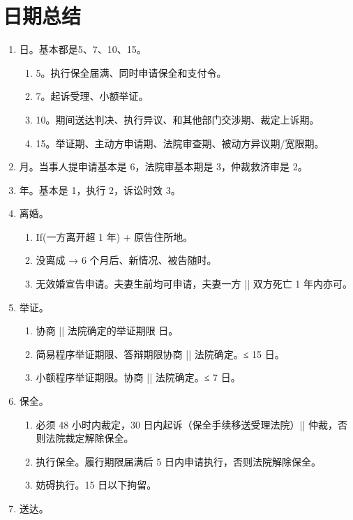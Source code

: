 \section{日期总结}
\begin{enumerate}
  \item 日。基本都是5、7、10、15。
        \begin{enumerate}
          \item 5。执行保全届满、同时申请保全和支付令。
          \item 7。起诉受理、小额举证。
          \item 10。期间送达判决、执行异议、和其他部门交涉期、裁定上诉期。
          \item 15。举证期、主动方申请期、法院审查期、被动方异议期/宽限期。
        \end{enumerate}
  \item 月。当事人提申请基本是 6，法院审基本期是 3，仲裁救济审是 2。
  \item 年。基本是 1，执行 2，诉讼时效 3。
  \item 离婚。
        \begin{enumerate}
          \item If(一方离开超 1 年) + 原告住所地。
          \item 没离成 → 6 个月后、新情况、被告随时。
          \item 无效婚宣告申请。夫妻生前均可申请，夫妻一方 || 双方死亡 1 年内亦可。
        \end{enumerate}
  \item 举证。
        \begin{enumerate}
          \item 协商 || 法院确定的举证期限  日。
          \item 简易程序举证期限、答辩期限协商 || 法院确定。≤ 15 日。
          \item 小额程序举证期限。协商 || 法院确定。≤ 7 日。
        \end{enumerate}
  \item 保全。
        \begin{enumerate}
          \item 必须 48 小时内裁定，30 日内起诉（保全手续移送受理法院）|| 仲裁，否则法院裁定解除保全。
          \item 执行保全。履行期限届满后 5 日内申请执行，否则法院解除保全。
          \item 妨碍执行。15 日以下拘留。
        \end{enumerate}
  \item 送达。

\end{enumerate}

